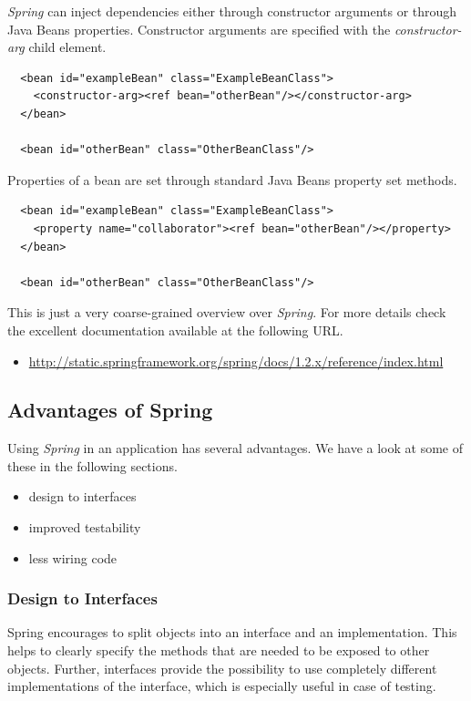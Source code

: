 \emph{Spring} can inject dependencies either through
constructor arguments or through Java Beans properties. Constructor arguments
are specified with the \emph{constructor-arg} child element.

\small{\begin{verbatim}
  <bean id="exampleBean" class="ExampleBeanClass">
    <constructor-arg><ref bean="otherBean"/></constructor-arg>
  </bean>
  
  <bean id="otherBean" class="OtherBeanClass"/>
\end{verbatim}}

Properties of a bean are set through standard Java Beans property set methods.

\small{\begin{verbatim}
  <bean id="exampleBean" class="ExampleBeanClass">
    <property name="collaborator"><ref bean="otherBean"/></property>
  </bean>
  
  <bean id="otherBean" class="OtherBeanClass"/>
\end{verbatim}}

This is just a very coarse-grained overview over \emph{Spring}. For more
details check the excellent documentation available at the following
URL.

\begin{itemize}
 \item \href{http://static.springframework.org/spring/docs/1.2.x/reference/index.html}{http://static.springframework.org/spring/docs/1.2.x/reference/index.html}
\end{itemize}


\subsection{Advantages of Spring}

Using \emph{Spring} in an application has several advantages. We have a look
at some of these in the following sections.

\begin{itemize}
 \item design to interfaces
 \item improved testability
 \item less wiring code
\end{itemize}

\subsubsection{Design to Interfaces}
Spring encourages to split objects into an interface and an implementation.
This helps to clearly specify the methods that are needed to be exposed to
other objects. Further, interfaces provide the possibility to use completely
different implementations of the interface, which is especially useful in
case of testing.

